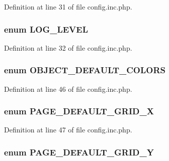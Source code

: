 Definition at line 31 of file config.inc.php.

\hypertarget{config_8inc_8php_aa5a9053636a30269210c54e734e0d583}{
\subsubsection[{LOG\_\-LEVEL}]{\setlength{\rightskip}{0pt plus 5cm}enum {\bf LOG\_\-LEVEL}}}
\label{config_8inc_8php_aa5a9053636a30269210c54e734e0d583}


Definition at line 32 of file config.inc.php.

\hypertarget{config_8inc_8php_a3e205a45d91d7ef191e53487b6b48b3b}{
\subsubsection[{OBJECT\_\-DEFAULT\_\-COLORS}]{\setlength{\rightskip}{0pt plus 5cm}enum {\bf OBJECT\_\-DEFAULT\_\-COLORS}}}
\label{config_8inc_8php_a3e205a45d91d7ef191e53487b6b48b3b}


Definition at line 46 of file config.inc.php.

\hypertarget{config_8inc_8php_abc1c54acdbce897c718854b663517cf9}{
\subsubsection[{PAGE\_\-DEFAULT\_\-GRID\_\-X}]{\setlength{\rightskip}{0pt plus 5cm}enum {\bf PAGE\_\-DEFAULT\_\-GRID\_\-X}}}
\label{config_8inc_8php_abc1c54acdbce897c718854b663517cf9}


Definition at line 47 of file config.inc.php.

\hypertarget{config_8inc_8php_ab93c5dcea5ef58747b80594c3d9304d7}{
\subsubsection[{PAGE\_\-DEFAULT\_\-GRID\_\-Y}]{\setlength{\rightskip}{0pt plus 5cm}enum {\bf PAGE\_\-DEFAULT\_\-GRID\_\-Y}}}
\label{config_8inc_8php_ab93c5dcea5ef58747b80594c3d9304d7}


